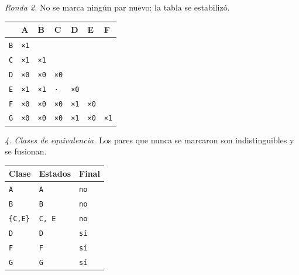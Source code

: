 \documentclass[11pt]{article}
\begin{document}
\textit{Ronda 2.} No se marca ningún par nuevo: la tabla se estabilizó.
\begin{center}\footnotesize\begin{tabular}{lllllll}\toprule
 & A & B & C & D & E & F \\\midrule
\texttt{B} & \texttt{×1} & \texttt{} & \texttt{} & \texttt{} & \texttt{} & \texttt{} \\
\texttt{C} & \texttt{×1} & \texttt{×1} & \texttt{} & \texttt{} & \texttt{} & \texttt{} \\
\texttt{D} & \texttt{×0} & \texttt{×0} & \texttt{×0} & \texttt{} & \texttt{} & \texttt{} \\
\texttt{E} & \texttt{×1} & \texttt{×1} & \texttt{·} & \texttt{×0} & \texttt{} & \texttt{} \\
\texttt{F} & \texttt{×0} & \texttt{×0} & \texttt{×0} & \texttt{×1} & \texttt{×0} & \texttt{} \\
\texttt{G} & \texttt{×0} & \texttt{×0} & \texttt{×0} & \texttt{×1} & \texttt{×0} & \texttt{×1} \\
\bottomrule\end{tabular}\end{center}
\textit{4. Clases de equivalencia.} Los pares que nunca se marcaron son indistinguibles y se fusionan.
\begin{center}\footnotesize\begin{tabular}{lll}\toprule
Clase & Estados & Final \\\midrule
\texttt{A} & \texttt{A} & \texttt{no} \\
\texttt{B} & \texttt{B} & \texttt{no} \\
\texttt{\{C,E\}} & \texttt{C, E} & \texttt{no} \\
\texttt{D} & \texttt{D} & \texttt{sí} \\
\texttt{F} & \texttt{F} & \texttt{sí} \\
\texttt{G} & \texttt{G} & \texttt{sí} \\
\bottomrule\end{tabular}\end{center}
\end{document}
